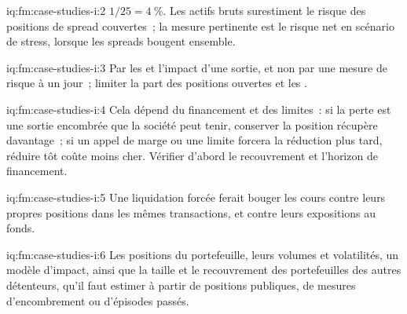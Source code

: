 \begin{solution}{iq:fm:case-studies-i:2}
$1/25=4~\%$. Les actifs bruts surestiment le risque des positions de spread couvertes~; la mesure pertinente est le risque net en scénario de stress, lorsque les spreads bougent ensemble.
\end{solution}

\begin{solution}{iq:fm:case-studies-i:3}
Par les  et l'impact d'une sortie, et non par une mesure de risque à un jour~; limiter la part des positions ouvertes et les .
\end{solution}

\begin{solution}{iq:fm:case-studies-i:4}
Cela dépend du financement et des limites~: si la perte est une sortie encombrée que la société peut tenir, conserver la position récupère davantage~; si un appel de marge ou une limite
forcera la réduction plus tard, réduire tôt coûte moins cher. Vérifier d'abord le recouvrement et l'horizon de financement.
\end{solution}

\begin{solution}{iq:fm:case-studies-i:5}
Une liquidation forcée ferait bouger les cours contre leurs propres positions dans les mêmes transactions, et contre leurs expositions au fonds.
\end{solution}

\begin{solution}{iq:fm:case-studies-i:6}
Les positions du portefeuille, leurs volumes et volatilités, un modèle d'impact, ainsi que la taille et le recouvrement des portefeuilles des autres détenteurs, qu'il faut estimer à partir de
positions publiques, de mesures d'encombrement ou d'épisodes passés.
\end{solution}
